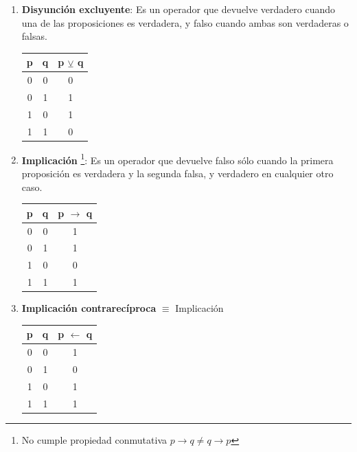 \begin{enumerate}
	\item \textbf{Disyunción excluyente}: Es un operador que devuelve 
	verdadero cuando una de las proposiciones es verdadera, y falso cuando 
	ambas son verdaderas o falsas.
	\begin{center}
		\begin{tabular}{|c|c|c|}
			\hline
			\textbf{p} & \textbf{q} & \textbf{p} $\veebar$ \textbf{q}\\
			\cline{0 - 1}
			\hline
			0 & 0 & 0\\
			0 & 1 & 1\\
			1 & 0 & 1\\
			1 & 1 & 0\\
			\hline
		\end{tabular}
	\end{center}
	
	\item \textbf{Implicación} \footnote{No cumple propiedad conmutativa 
		$p \to q \neq q \to p$}: Es un operador que devuelve falso sólo cuando la 
	primera proposición es verdadera y la segunda falsa, y verdadero en 
	cualquier otro caso.
	\begin{center}
		\begin{tabular}{|c|c|c|}
			\hline
			\textbf{p} & \textbf{q} & \textbf{p} $\to$ \textbf{q}\\
			\cline{0 - 1}
			\hline
			0 & 0 & 1\\
			0 & 1 & 1\\
			1 & 0 & 0\\
			1 & 1 & 1\\
			\hline
		\end{tabular}
	\end{center}
	
	\item \textbf{Implicación contrarecíproca} $\equiv$ Implicación
	\begin{center}
		\begin{tabular}{|c|c|c|}
			\hline
			\textbf{p} & \textbf{q} & \textbf{p} $\leftarrow$ \textbf{q}\\
			\cline{0 - 1}
			\hline
			0 & 0 & 1\\
			0 & 1 & 0\\
			1 & 0 & 1\\
			1 & 1 & 1\\
			\hline
		\end{tabular}
	\end{center}
	

\end{enumerate}
